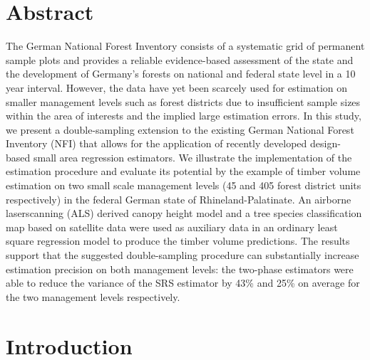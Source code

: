 \section*{Abstract}
\label{chap:sae:Abstract}
The German National Forest Inventory consists of a systematic grid of permanent sample plots and provides a reliable evidence-based assessment of the state and the development of Germany's forests on national and federal state level in a 10 year interval. However, the data have yet been scarcely used for estimation on smaller management levels such as forest districts due to insufficient sample sizes within the area of interests and the implied large estimation errors. In this study, we present a double-sampling extension to the existing German National Forest Inventory (NFI) that allows for the application of recently developed design-based small area regression estimators. We illustrate the implementation of the estimation procedure and evaluate its potential by the example of timber volume estimation on two small scale management levels (45 and 405 forest district units respectively) in the federal German state of Rhineland-Palatinate. An airborne laserscanning (ALS) derived canopy height model and a tree species classification map based on satellite data were used as auxiliary data in an ordinary least square regression model to produce the timber volume predictions. The results support that the suggested double-sampling procedure can substantially increase estimation precision on both management levels: the two-phase estimators were able to reduce the variance of the SRS estimator by 43\% and 25\% on average for the two management levels respectively.



\section{Introduction}
\label{sec:intro}

